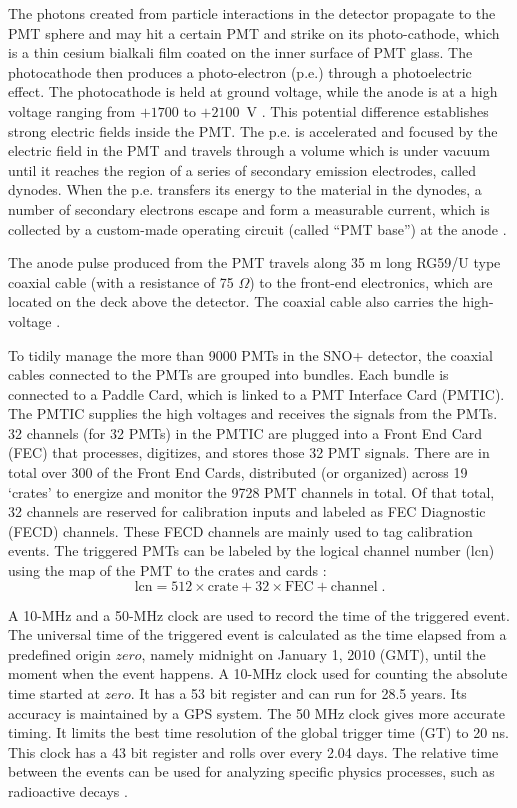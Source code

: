 The photons created from particle interactions in the detector propagate to the PMT sphere and may hit a certain PMT and strike on its photo-cathode, which is a thin cesium bialkali film coated on the inner surface of PMT glass. The photocathode then produces a photo-electron (p.e.) through a photoelectric effect. The photocathode is held at ground voltage, while the anode is at a high voltage ranging from $+1700$ to $+2100$~V \cite{boger2000sudbury,dunger2018topological}. This potential difference establishes strong electric fields inside the PMT. The p.e. is accelerated and focused by the electric field in the PMT and travels through a volume which is under vacuum until it reaches the region of a series of secondary emission electrodes, called dynodes. When the p.e. transfers its energy to the material in the dynodes, a number of secondary electrons escape and form a measurable current, which is collected by a custom-made operating circuit (called ``PMT base'') at the anode \cite{hamamatsu2018photomultiplier}.

The anode pulse produced from the PMT travels along 35 m long RG59/U type coaxial cable (with a resistance of 75 $\Omega$) to the front-end electronics, which are located on the deck above the detector. The coaxial cable also carries the high-voltage \cite{boger2000sudbury}. 

To tidily manage the more than 9000 PMTs in the SNO+ detector, the coaxial cables connected to the PMTs are grouped into bundles. Each bundle is connected to a Paddle Card, which is linked to a PMT Interface Card (PMTIC). The PMTIC supplies the high voltages and receives the signals from the PMTs. 32 channels (for 32 PMTs) in the PMTIC are plugged into a Front End Card (FEC) that processes, digitizes, and stores those 32 PMT signals. There are in total over 300 of the Front End Cards, distributed (or organized) across 19 `crates' to energize and monitor the 9728 PMT channels in total. Of that total, 32 channels are reserved for calibration inputs and labeled as FEC Diagnostic (FECD) channels. These FECD channels are mainly used to tag calibration events. The triggered PMTs can be labeled by the logical channel number (lcn) using the map of the PMT to the crates and cards \cite{snop_jinst,stringer2019sensitivity}:
\begin{equation}
\mathrm{lcn = 512 \times crate + 32 \times FEC + channel}\; .
\end{equation}

A 10-MHz and a 50-MHz clock are used to record the time of the triggered event. The universal time of the triggered event is calculated as the time elapsed from a predefined origin $zero$, namely midnight on January 1, 2010 (GMT), until the moment when the event happens. A 10-MHz clock used for counting the absolute time started at $zero$. It has a 53 bit register and can run for 28.5 years. Its accuracy is maintained by a GPS system. The 50 MHz clock gives more accurate timing. It limits the best time resolution of the global trigger time (GT) to 20 ns. This clock has a 43 bit register and rolls over every 2.04 days. The relative time between the events can be used for analyzing specific physics processes, such as radioactive decays \cite{rattime,stringer2019sensitivity}. 

